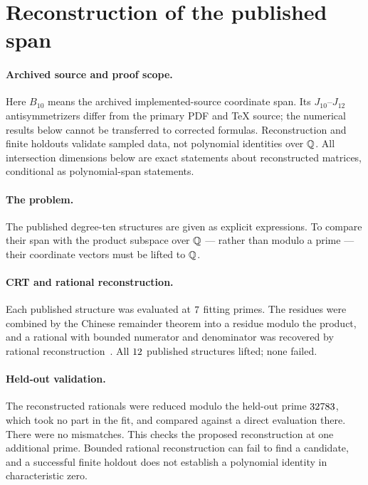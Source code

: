 \section{Reconstruction of the published span}
\label{app:b10}

\paragraph{Archived source and proof scope.}
Here $B_{10}$ means the archived implemented-source coordinate span. Its
$J_{10}$--$J_{12}$ antisymmetrizers differ from the primary PDF and TeX source;
the numerical results below cannot be transferred to corrected formulas.
Reconstruction and finite holdouts validate sampled data, not polynomial
identities over $\mathbb{Q}$. All intersection dimensions below are exact statements
about reconstructed matrices, conditional as polynomial-span statements.

\paragraph{The problem.}
The published degree-ten structures are given as explicit expressions. To compare
their span with the product subspace over $\mathbb{Q}$ --- rather than modulo a prime ---
their coordinate vectors must be lifted to $\mathbb{Q}$.

\paragraph{CRT and rational reconstruction.}
Each published structure was evaluated at $7$ fitting primes. The
residues were combined by the Chinese remainder theorem into a residue modulo the
product, and a rational with bounded numerator and denominator was recovered by
rational reconstruction~\cite{Wang:1982}. All $12$ published structures
lifted; none failed.

\paragraph{Held-out validation.}
The reconstructed rationals were reduced modulo the held-out prime
$32783$, which took no part in the fit, and compared against a direct
evaluation there. There were no mismatches. This checks the proposed reconstruction at one additional prime. Bounded
rational reconstruction can fail to find a candidate, and a successful finite
holdout does not establish a polynomial identity in characteristic zero.

